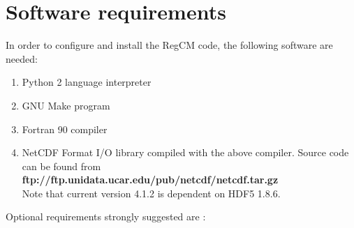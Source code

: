 %
%

\section{Software requirements}

In order to configure and install the RegCM code, the following software are
needed:

\begin{enumerate}
\item Python 2 language interpreter
\item GNU Make program
\item Fortran 90 compiler
\item NetCDF Format I/O library compiled with the above compiler.
   Source code can be found from \\
{\bf ftp://ftp.unidata.ucar.edu/pub/netcdf/netcdf.tar.gz} \\
Note that current version 4.1.2 is dependent on HDF5 1.8.6.
\end{enumerate}

Optional requirements strongly suggested are :

